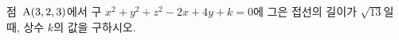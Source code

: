 점~$\mathrm{A}(3{,}\mkern3mu\mathopen{}2{,}\mkern3mu\mathopen{}3)$에서 구 $x^2+y^2+z^2-2x+4y+k=0$에 그은 접선의 길이가 $\sqrt{13}$일 때, 상수 $k$의 값을 구하시오.
